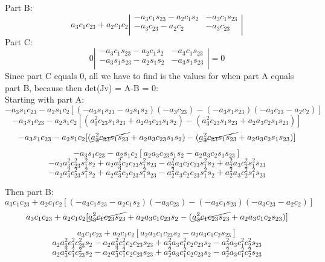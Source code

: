 \documentclass[12pt,norsk,a4paper]{article}
\begin{document}
    Part B:
    \[a_3c_1c_{23}+a_2c_1c_2 \left|\begin{array}{cc}
        -a_3c_1s_{23}-a_2c_1s_2 & -a_3c_1s_{23}\\
        -a_3c_{23}-a_2c_2 & -a_3c_{23}\\
    \end{array}\right|\]
    Part C:
    \[0\left|\begin{array}{cc}
        -a_3c_1s_{23}-a_2c_1s_2 & -a_3c_1s_{23}\\
        -a_3s_1s_{23}-a_2s_1s_2 & -a_3s_1s_{23}\\
    \end{array}\right| = 0\]
    Since part C equals 0, all we have to find is the values for when part A equals part B, because then det(Jv) = A-B = 0:\\
    Starting with part A:
    \[-a_3s_1c_{23}-a_2s_1c_2[(-a_3s_1s_{23}-a_2s_1s_2)(-a_3c_{23})-(-a_3s_1s_{23})(-a_3c_{23}-a_2c_2)]\]
    \[-a_3s_1c_{23}-a_2s_1c_2[(a_3^2c_{23}s_1s_{23}+a_2a_3c_{23}s_1s_2)-(a_3^2c_{23}s_1s_{23} + a_2a_3c_2s_1s_{23})]\]
    \[-a_3s_1c_{23}-a_2s_1c_2[(\cancel{a_3^2c_{23}s_1s_{23}}+a_2a_3c_{23}s_1s_2)-(\cancel{a_3^2c_{23}s_1s_{23}} + a_2a_3c_2s_1s_{23})]\]
    \[-a_3s_1c_{23}-a_2s_1c_2[a_2a_3c_{23}s_1s_2-a_2a_3c_2s_1s_{23}]\]
    \[-a_2a_3^2c_{23}^2s_1^2s_2 + a_2a_3^2c_2c_{23}s_1^2s_{23} - a_2^2a_3c_2c_{23}s_1^2s_2 +a_2^2a_3c_2^2s_1^2s_{23}\]
    \[-a_2a_3^2c_{23}^2s_1^2s_2 + a_2a_3^2c_2c_{23}s_1^2s_{23} - a_2^2a_3c_2c_{23}s_1^2s_2 +a_2^2a_3c_2^2s_1^2s_{23}\]


    Then part B:
    \[a_3c_1c_{23}+a_2c_1c_2[(-a_3c_1s_{23}-a_2c_1s_2)(-a_3c_{23})-(-a_3c_1s_{23})(-a_3c_{23}-a_2c_2)]\]
    \[a_3c_1c_{23}+a_2c_1c_2[\cancel{a_3^2c_1c_{23}s_{23}}+a_2a_3c_1c_{23}s_2 - (\cancel{a_3^2c_1c_{23}s_{23}}+a_2a_3c_1c_2s_{23})]\]
    \[a_3c_1c_{23}+a_2c_1c_2[a_2a_3c_1c_{23}s_2 -a_2a_3c_1c_2s_{23}]\]
    \[a_2a_3^2c_1^2c_{23}^2s_2 - a_2a_3^2c_1^2c_2c_{23}s_{23} + a_2^2a_3c_1^2c_2c_{23}s_2 -a_2^2a_3c_1^2c_2^2s_{23}\]
    \[a_2a_3^2c_1^2c_{23}^2s_2 - a_2a_3^2c_1^2c_2c_{23}s_{23} + a_2^2a_3c_1^2c_2c_{23}s_2 -a_2^2a_3c_1^2c_2^2s_{23}\]
    
\end{document}
